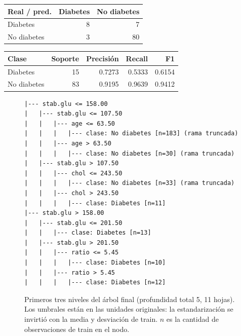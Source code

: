 \documentclass[11pt]{article}
\begin{document}
\begin{table}[H]\footnotesize\begin{minipage}[t]{0.44\linewidth}\centering{}\begin{tabular}{lrr}\toprule
Real / pred. & Diabetes & No diabetes \\ \midrule
Diabetes & 8 & 7 \\
No diabetes & 3 & 80 \\
\bottomrule\end{tabular}\end{minipage}\hfill\begin{minipage}[t]{0.52\linewidth}\centering{}\begin{tabular}{lrrrr}\toprule
Clase & Soporte & Precisión & Recall & F1 \\ \midrule
Diabetes & 15 & 0.7273 & 0.5333 & 0.6154 \\
No diabetes & 83 & 0.9195 & 0.9639 & 0.9412 \\
\bottomrule\end{tabular}\end{minipage}\end{table}

\begin{figure}[H]\centering\begin{minipage}{0.92\linewidth}\scriptsize\begin{verbatim}
|--- stab.glu <= 158.00
|   |--- stab.glu <= 107.50
|   |   |--- age <= 63.50
|   |   |   |--- clase: No diabetes [n=183] (rama truncada)
|   |   |--- age > 63.50
|   |   |   |--- clase: No diabetes [n=30] (rama truncada)
|   |--- stab.glu > 107.50
|   |   |--- chol <= 243.50
|   |   |   |--- clase: No diabetes [n=33] (rama truncada)
|   |   |--- chol > 243.50
|   |   |   |--- clase: Diabetes [n=11]
|--- stab.glu > 158.00
|   |--- stab.glu <= 201.50
|   |   |--- clase: Diabetes [n=13]
|   |--- stab.glu > 201.50
|   |   |--- ratio <= 5.45
|   |   |   |--- clase: Diabetes [n=10]
|   |   |--- ratio > 5.45
|   |   |   |--- clase: Diabetes [n=12]
\end{verbatim}\end{minipage}\caption{Primeros tres niveles del árbol final (profundidad total 5, 11 hojas). Los umbrales están en las unidades originales: la estandarización se invirtió con la media y desviación de train. $n$ es la cantidad de observaciones de train en el nodo.}\end{figure}
\end{document}
